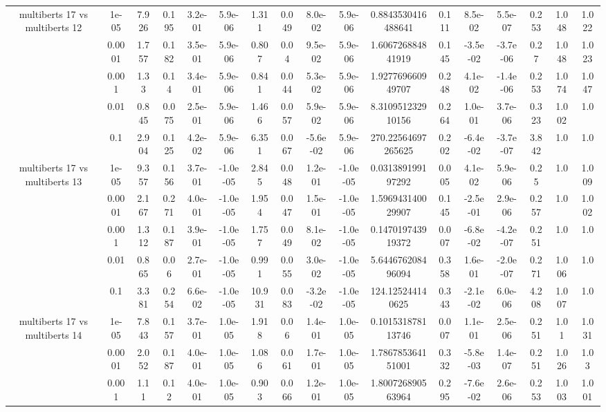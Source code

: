 \begin{tabular}{|c|c|c|c|c|c|c|c|c|c|c|c|c|c|c|c|c|}
\hline
\multirow{5}{*}{multiberts 17 vs multiberts 12} & 1e-05 & 7.926 & 0.195 & 3.2e-01 & 5.9e-06 & 1.311 & 0.049 & 8.0e-02 & 5.9e-06 & 0.8843530416488641 & 0.111 & 8.5e-02 & 5.5e-07 & 0.253 & 1.048 & 1.022 \\
 & 0.0001 & 1.757 & 0.182 & 3.5e-01 & 5.9e-06 & 0.807 & 0.04 & 9.5e-02 & 5.9e-06 & 1.606726884841919 & 0.145 & -3.5e-02 & -3.7e-06 & 0.27 & 1.048 & 1.023 \\
 & 0.001 & 1.33 & 0.14 & 3.4e-01 & 5.9e-06 & 0.841 & 0.044 & 5.3e-02 & 5.9e-06 & 1.927769660949707 & 0.248 & 4.1e-02 & -1.4e-06 & 0.253 & 1.074 & 1.047 \\
 & 0.01 & 0.845 & 0.075 & 2.5e-01 & 5.9e-06 & 1.466 & 0.057 & 5.9e-02 & 5.9e-06 & 8.310951232910156 & 0.264 & 1.0e-01 & 3.7e-06 & 0.323 & 1.002 & 1.0 \\
 & 0.1 & 2.904 & 0.125 & 4.2e-02 & 5.9e-06 & 6.351 & 0.067 & -5.6e-02 & 5.9e-06 & 270.22564697265625 & 0.202 & -6.4e-02 & -3.7e-07 & 3.842 & 1.0 & 1.0 \\
\hline
\multirow{5}{*}{multiberts 17 vs multiberts 13} & 1e-05 & 9.357 & 0.156 & 3.7e-01 & -1.0e-05 & 2.845 & 0.048 & 1.2e-01 & -1.0e-05 & 0.031389199197292 & 0.005 & 4.1e-02 & 5.9e-06 & 0.25 & 1.0 & 1.009 \\
 & 0.0001 & 2.167 & 0.271 & 4.0e-01 & -1.0e-05 & 1.954 & 0.047 & 1.5e-01 & -1.0e-05 & 1.596943140029907 & 0.145 & -2.5e-01 & 2.9e-06 & 0.257 & 1.0 & 1.002 \\
 & 0.001 & 1.312 & 0.187 & 3.9e-01 & -1.0e-05 & 1.757 & 0.049 & 8.1e-02 & -1.0e-05 & 0.147019743919372 & 0.007 & -6.8e-02 & -4.2e-07 & 0.251 & 1.0 & 1.0 \\
 & 0.01 & 0.865 & 0.06 & 2.7e-01 & -1.0e-05 & 0.991 & 0.055 & 3.0e-02 & -1.0e-05 & 5.644676208496094 & 0.358 & 1.6e-01 & -2.0e-07 & 0.271 & 1.006 & 1.0 \\
 & 0.1 & 3.381 & 0.254 & 6.6e-02 & -1.0e-05 & 10.931 & 0.083 & -3.2e-02 & -1.0e-05 & 124.125244140625 & 0.343 & -2.1e-02 & 6.0e-06 & 4.208 & 1.007 & 1.0 \\
\hline
\multirow{5}{*}{multiberts 17 vs multiberts 14} & 1e-05 & 7.843 & 0.157 & 3.7e-01 & 1.0e-05 & 1.918 & 0.06 & 1.4e-01 & 1.0e-05 & 0.101531878113746 & 0.007 & 1.1e-01 & 2.5e-06 & 0.251 & 1.01 & 1.031 \\
 & 0.0001 & 2.052 & 0.187 & 4.0e-01 & 1.0e-05 & 1.086 & 0.061 & 1.7e-01 & 1.0e-05 & 1.786785364151001 & 0.332 & -5.8e-03 & 1.4e-07 & 0.251 & 1.026 & 1.03 \\
 & 0.001 & 1.11 & 0.12 & 4.0e-01 & 1.0e-05 & 0.903 & 0.066 & 1.2e-01 & 1.0e-05 & 1.800726890563964 & 0.295 & -7.6e-02 & 2.6e-06 & 0.253 & 1.003 & 1.001 \\

\end{tabular}

